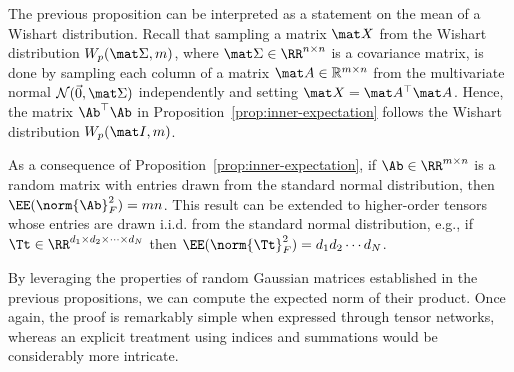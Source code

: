 The previous proposition can be interpreted as a statement on the mean of a Wishart distribution.  
Recall that  sampling a matrix $\mat X$ from the Wishart distribution $W_p(\mat \Sigma, m)$, where $\mat \Sigma \in \RR^{n\times n}$ is a covariance matrix, is done by sampling each column of a matrix $\mat A\in\mathbb R^{m\times n}$ from the multivariate normal $\mathcal N(\vec 0 , \mat \Sigma)$ independently and setting $\mat X = \mat A^\top\mat A$. Hence, the matrix $\Ab ^\top \Ab$ in Proposition~\ref{prop:inner-expectation} follows the Wishart distribution  $W_p(\mat I,m)$.
\begin{remark} As a consequence of Proposition~\ref{prop:inner-expectation}, if $\Ab \in \RR^{m \times n}$ is a random matrix with entries drawn from the standard normal distribution, then $\EE(\norm{\Ab}_F^2) = mn$. 
This result can be extended to higher-order tensors whose entries are drawn i.i.d. from the standard normal distribution, e.g., if $\Tt\in\RR^{d_1\times d_2\times\cdots\times d_N}$ then $\EE(\norm{\Tt}_F^2) = d_1d_2\cdots d_N$.
\end{remark}
By leveraging the properties of random Gaussian matrices established in the previous propositions, we can compute the expected norm of their product. Once again, the proof is remarkably simple when expressed through tensor networks, whereas an explicit treatment using indices and summations would be considerably more intricate.
